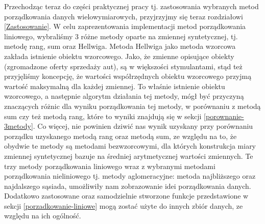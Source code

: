 \documentclass[12pt,a4paper]{report}
\begin{document}
Przechodząc teraz do części praktycznej pracy tj. zastosowania wybranych metod porządkowania danych wielowymiarowych, przyjrzyjmy się teraz rozdziałowi \ref{Zastosowanie}. W celu zaprezentowania implementacji metod porządkowania liniowego, wybraliśmy 3 różne metody oparte na zmiennej syntetycznej, tj. metodę rang, sum oraz Hellwiga. Metoda Hellwiga jako metoda wzorcowa zakłada istnienie obiektu wzorcowego. Jako, że zmienne opisujące obiekty (zgromadzone oferty sprzedaży aut), są w większości stymulantami, stąd też przyjęliśmy koncepcję, że wartości współrzędnych obiektu wzorcowego przyjmą wartość maksymalną dla każdej zmiennej. To właśnie istnienie obiektu wzorcowego, a następnie algorytm działania tej metody, mógł być przyczyną znaczących różnic dla wyniku porządkowania tej metody, w porównaniu z metodą sum czy też metodą rang, które to wyniki znajdują się w sekcji \ref{porownanie-3metody}. Co więcej, nie powinien dziwić nas wynik uzyskany przy porównaniu porządku uzyskanego metodą rang oraz metodą sum, ze względu na to, że obydwie te metody są metodami bezwzorcowymi, dla których konstrukcja miary zmiennej syntetycznej bazuje na średniej arytmetycznej wartości zmiennych. Te trzy metody porządkowania liniowego wraz z wybranymi metodami porządkowania nieliniowego tj. metody aglomeracyjne: metoda najbliższego oraz najdalszego sąsiada, umożliwiły nam zobrazowanie idei porządkowania danych. Dodatkowo zastosowane oraz samodzielnie stworzone funkcje przedstawione w sekcji \ref{porzadkowanie-liniowe} mogą zostać użyte do innych zbiór danych, ze względu na ich ogólność. 

 









\end{document}
